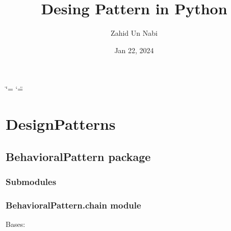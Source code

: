 \documentclass[letterpaper,10pt,english]{sphinxmanual}
\title{Desing Pattern in Python}
\date{Jan 22, 2024}
\author{Zahid Un Nabi}
\begin{document}
\ifdefined\shorthandoff
  \ifnum\catcode`\=\string=\active\shorthandoff{=}\fi
  \ifnum\catcode`\"=\active{}\fi
\fi

\pagestyle{empty}
\sphinxmaketitle
\pagestyle{plain}
\sphinxtableofcontents
\pagestyle{normal}
\label{\detokenize{index::doc}}


\sphinxstepscope


\chapter{DesignPatterns}
\label{\detokenize{modules:designpatterns}}\label{\detokenize{modules::doc}}
\sphinxstepscope


\section{BehavioralPattern package}
\label{\detokenize{BehavioralPattern:behavioralpattern-package}}\label{\detokenize{BehavioralPattern::doc}}

\subsection{Submodules}
\label{\detokenize{BehavioralPattern:submodules}}

\subsection{BehavioralPattern.chain module}
\label{\detokenize{BehavioralPattern:module-BehavioralPattern.chain}}\label{\detokenize{BehavioralPattern:behavioralpattern-chain-module}}

\begin{fulllineitems}
\label{\detokenize{BehavioralPattern:BehavioralPattern.chain.Client}}
\pysigstartsignatures
{}
\pysigstopsignatures
\sphinxAtStartPar
Bases: 

\begin{fulllineitems}
\label{\detokenize{BehavioralPattern:BehavioralPattern.chain.Client.delegate}}
\pysigstartsignatures
{}
\pysigstopsignatures
\end{fulllineitems}


\end{fulllineitems}
\end{document}
